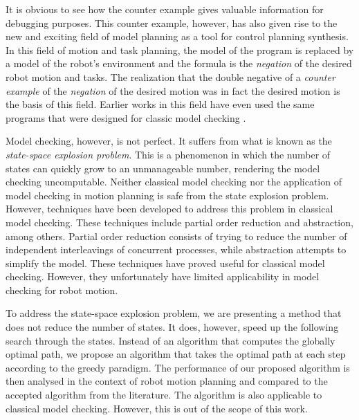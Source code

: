 It is obvious to see how the counter example gives valuable information for debugging purposes. This counter example, however, has also given rise to the new and exciting field of model planning as a tool for control planning synthesis. In this field of motion and task planning, the model of the program is replaced by a model of the robot's environment and the formula is the \textit{negation} of the desired robot motion and tasks. The realization that the double negative of a \textit{counter example} of the \textit{negation} of the desired motion was in fact the desired motion is the basis of this field. Earlier works in this field have even used the same programs that were designed for classic model checking \cite{fainekos05}. %

Model checking, however, is not perfect. It suffers from what is known as the \textit{state-space explosion problem}. This is a phenomenon in which the number of states can quickly grow to an unmanageable number, rendering the model checking uncomputable. Neither classical model checking nor the application of model checking in motion planning is safe from the state explosion problem. However, techniques have been developed to address this problem in classical model checking. These techniques include partial order reduction and abstraction, among others. Partial order reduction consists of trying to reduce the number of independent interleavings of concurrent processes, while abstraction attempts to simplify the model. These techniques have proved useful for classical model checking. However, they unfortunately have limited applicability in model checking for robot motion.  

To address the state-space explosion problem, we are presenting a method that does not reduce the number of states. It does, however, speed up the following search through the states. Instead of an algorithm that computes the globally optimal path, we propose an algorithm that takes the optimal path at each step according to the greedy paradigm. The performance of our proposed algorithm is then analysed in the context of robot motion planning and compared to the accepted algorithm from the literature. The algorithm is also applicable to classical model checking. However, this is out of the scope of this work. 

